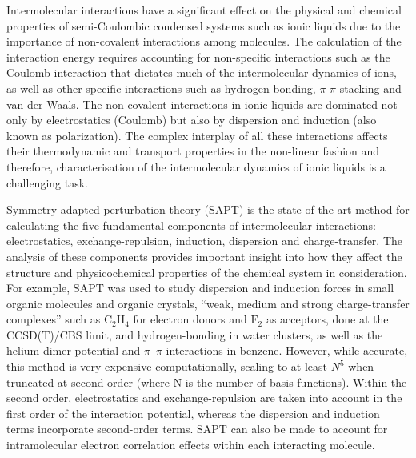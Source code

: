 

Intermolecular interactions have a significant effect on the physical and chemical properties of semi-Coulombic condensed systems such as ionic liquids due to the importance of non-covalent interactions among molecules. 
The calculation of the interaction energy requires accounting for non-specific interactions such as the Coulomb interaction that dictates much of the intermolecular dynamics of ions, as well as other specific interactions such as hydrogen-bonding, $\pi$-$\pi$ stacking and van der Waals.
\cite{Wendler2012a, Bedrov2010a, Izgorodina2011a}
The non-covalent interactions in ionic liquids are dominated not only by electrostatics (Coulomb) but also by dispersion and induction (also known as polarization). 
\cite{Izgorodina2011b, Izgorodina2014a}
The complex interplay of all these interactions affects their thermodynamic and transport properties in the non-linear fashion\cite{Izgorodina2014a} and therefore, characterisation of the intermolecular dynamics of ionic liquids is a challenging task. 
\cite{Izgorodina2011a}



Symmetry-adapted perturbation theory (SAPT)
\cite{Misquitta2008a, Misquitta2008b, Parker2014a}
is the state-of-the-art method for calculating the five fundamental components of intermolecular interactions: electrostatics, exchange-repulsion, induction, dispersion and charge-transfer.
The analysis of these components provides important insight into how they affect the structure and physicochemical properties of the chemical system in consideration.
\cite{Stone1996a, Turney2012a}
For example, SAPT was used to study dispersion
\cite{Misquitta2005a} and
induction forces in small organic molecules and organic crystals,
\cite{Misquitta2008a, Misquitta2008b, Welch2008a}
``weak, medium and strong charge-transfer complexes'' such as $\text{C}_2\text{H}_4$ for electron donors and $\text{F}_2$ as acceptors, done at the CCSD(T)/CBS limit,
\cite{Karthikeyan2011a}
and hydrogen-bonding in water clusters,
\cite{Milet1999a} 
as well as the helium dimer potential
\cite{Korona1997a}
and $\pi \text{--} \pi$ interactions in benzene.
\cite{Sinnokrot2004a, Sinnokrot2006a}
However, while accurate, this method is very expensive computationally, scaling to at least $N^5$ when truncated at second order (where N is the number of basis functions).
Within the second order, electrostatics and exchange-repulsion are taken into account in the first order of the interaction potential, whereas the dispersion and induction terms incorporate second-order terms. SAPT can also be made to account for intramolecular electron correlation effects within each interacting molecule.


